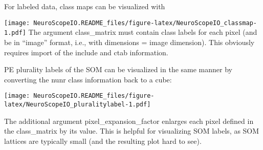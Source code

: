 \documentclass[]{article}
\newenvironment{Shaded}{\begin{snugshade}}{\end{snugshade}}
\newcommand{\CommentTok}[1]{\textcolor[rgb]{0.56,0.35,0.01}{\textit{#1}}}
\newcommand{\DataTypeTok}[1]{\textcolor[rgb]{0.13,0.29,0.53}{#1}}
\newcommand{\DecValTok}[1]{\textcolor[rgb]{0.00,0.00,0.81}{#1}}
\newcommand{\KeywordTok}[1]{\textcolor[rgb]{0.13,0.29,0.53}{\textbf{#1}}}
\newcommand{\NormalTok}[1]{#1}
\newcommand{\OperatorTok}[1]{\textcolor[rgb]{0.81,0.36,0.00}{\textbf{#1}}}
\newcommand{\StringTok}[1]{\textcolor[rgb]{0.31,0.60,0.02}{#1}}
\begin{document}
For labeled data, class maps can be visualized with

\begin{Shaded}
\end{Shaded}

\texttt{[image: NeuroScopeIO.README\_files/figure-latex/NeuroScopeIO\_classmap-1.pdf]}
The argument class\_matrix must contain class labels for each pixel (and be in ``image'' format, i.e., with dimensions = image dimension). This obviously requires import of the include and ctab information.

PE plurality labels of the SOM can be visualized in the same manner by converting the nunr class information back to a cube:

\begin{Shaded}
\end{Shaded}

\texttt{[image: NeuroScopeIO.README\_files/figure-latex/NeuroScopeIO\_pluralitylabel-1.pdf]}

The additional argument pixel\_expansion\_factor enlarges each pixel defined in the class\_matrix by its value. This is helpful for visualizing SOM labels, as SOM lattices are typically small (and the resulting plot hard to see).
\end{document}
